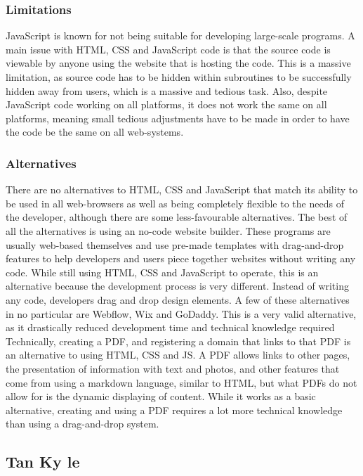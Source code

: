 \documentclass[a4paper, 11pt]{report}
\begin{document}
\subsubsection{Limitations}
JavaScript is known for not being suitable for developing large-scale programs. A main issue with HTML, CSS and JavaScript code is that the source code is viewable by anyone using the website that is hosting the code. This is a massive limitation, as source code has to be hidden within subroutines to be successfully hidden away from users, which is a massive and tedious task. Also, despite JavaScript code working on all platforms, it does not work the same on all platforms, meaning small tedious adjustments have to be made in order to have the code be the same on all web-systems.

\subsubsection{Alternatives}
There are no alternatives to HTML, CSS and JavaScript that match its ability to be used in all web-browsers as well as being completely flexible to the needs of the developer, although there are some less-favourable alternatives.
The best of all the alternatives is using an no-code website builder. These programs are usually web-based themselves and use pre-made templates with drag-and-drop features to help developers and users piece together websites without writing any code. While still using HTML, CSS and JavaScript to operate, this is an alternative because the development process is very different. Instead of writing any code, developers drag and drop design elements. A few of these alternatives in no particular are Webflow, Wix and GoDaddy. This is a very valid alternative, as it drastically reduced development time and technical knowledge required
Technically, creating a PDF, and registering a domain that links to that PDF is an alternative to using HTML, CSS and JS. A PDF allows links to other pages, the presentation of information with text and photos, and other features that come from using a markdown language, similar to HTML, but what PDFs do not allow for is the dynamic displaying of content. While it works as a basic alternative, creating and using a PDF requires a lot more technical knowledge than using a drag-and-drop system.

\subsection{Tan Ky le}
\end{document}
